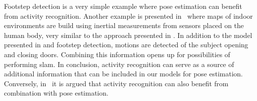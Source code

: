 Footstep detection is a very simple example where pose estimation can benefit from activity recognition. Another example is presented in~\cite{grzonkaDKB:2010} where maps of indoor environments are build using inertial measurements from sensors placed on the human body, very similar to the approach presented in . In addition to the model presented in  and footstep detection, motions are detected of the subject opening and closing doors. Combining this information opens up for possibilities of performing \gls{slam}. In conclusion, activity recognition can serve as a source of additional information that can be included in our models for pose estimation. Conversely, in~\cite{hardeggerRCT:2016,reissHBS:2010} it is argued that activity recognition can also benefit from combination with pose estimation. 